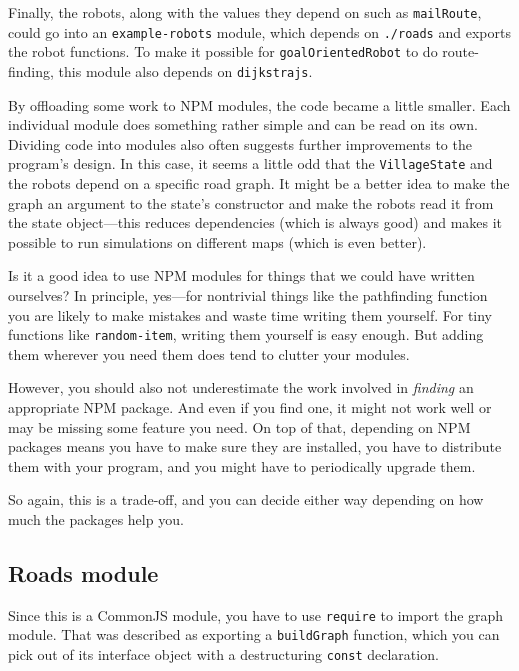 Finally, the robots, along with the values they depend on such as \lstinline`mailRoute`, could go into an \lstinline`example-robots` module, which depends on \lstinline`./roads` and exports the robot functions. To make it possible for \lstinline`goalOrientedRobot` to do route-finding, this module also depends on \lstinline`dijkstrajs`.

By offloading some work to NPM modules, the code became a little smaller. Each individual module does something rather simple and can be read on its own. Dividing code into modules also often suggests further improvements to the program's design. In this case, it seems a little odd that the \lstinline`VillageState` and the robots depend on a specific road graph. It might be a better idea to make the graph an argument to the state's constructor and make the robots read it from the state object—this reduces dependencies (which is always good) and makes it possible to run simulations on different maps (which is even better).

Is it a good idea to use NPM modules for things that we could have written ourselves? In principle, yes—for nontrivial things like the pathfinding function you are likely to make mistakes and waste time writing them yourself. For tiny functions like \lstinline`random-item`, writing them yourself is easy enough. But adding them wherever you need them does tend to clutter your modules.

However, you should also not underestimate the work involved in \emph{finding} an appropriate NPM package. And even if you find one, it might not work well or may be missing some feature you need. On top of that, depending on NPM packages means you have to make sure they are installed, you have to distribute them with your program, and you might have to periodically upgrade them.

So again, this is a trade-off, and you can decide either way depending on how much the packages help you.

\subsection{Roads module}

Since this is a CommonJS module, you have to use \lstinline`require` to import the graph module. That was described as exporting a \lstinline`buildGraph` function, which you can pick out of its interface object with a destructuring \lstinline`const` declaration.

